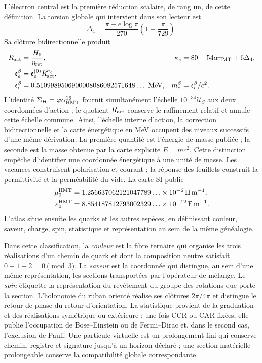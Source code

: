 L'électron central est la première réduction scalaire, de rang un, de cette
définition. La torsion globale qui intervient dans son lecteur est
\[
 \Delta_4=\frac{\pi-e\log\pi}{270}
 \left(1+\frac{\pi}{729}\right).
\]
Sa clôture bidirectionnelle produit
\[
 \begin{aligned}
 R_{\rm act}&=\frac{H_5}{\eta_{\rm ret}},
 &\kappa_e&=80-54\alpha_{\rm HMT}+6\Delta_4,\\
 \mathfrak e_e^\beta&=\mathfrak e_e^{(0)}R_{\rm act}^{\kappa_e},\\
 \mathfrak e_e^\beta
 &=0.5109989506900008086082571648\ldots\ {\rm MeV},
 &m_e^\beta&=\mathfrak e_e^\beta/c^2.
 \end{aligned}
\]
L'identité
\(\Sigma_H=\varphi\alpha_{\rm HMT}^{16}\) fournit simultanément
l'échelle \(10^{-34}\mathcal U_S\) aux deux coordonnées d'action ; le
quotient \(R_{\rm act}\) conserve le raffinement relatif et annule cette
échelle commune. Ainsi, l'échelle interne d'action, la correction bidirectionnelle et la
carte énergétique en MeV occupent des niveaux successifs d'une même dérivation.
La première quantité est l'énergie de masse publiée ; la seconde est la masse
obtenue par la carte explicite $E=mc^2$. Cette distinction empêche d'identifier
une coordonnée énergétique à une unité de masse.
Les vacances construisent polarisation et courant ; la réponse des feuillets
construit la permittivité et la perméabilité du vide. La carte SI publie
\[
 \begin{aligned}
 \mu_0^{\rm HMT}
 &=1.256637062121047789\ldots\times10^{-6}\,\mathrm{H\,m^{-1}},\\
 \varepsilon_0^{\rm HMT}
 &=8.854187812793002329\ldots\times10^{-12}\,\mathrm{F\,m^{-1}}.
 \end{aligned}
\]
L'atlas situe ensuite
les quarks et les autres espèces, en définissant couleur, saveur, charge, spin,
statistique et représentation au sein de la même généalogie.

Dans cette classification, la \emph{couleur} est la fibre ternaire qui organise les
trois réalisations d'un chemin de quark et dont la composition neutre satisfait
\(0+1+2=0\pmod3\). La \emph{saveur} est la coordonnée qui distingue, au sein
d'une même représentation, les sections transportées par l'opérateur de
mélange. Le \emph{spin} étiquette la représentation du revêtement du
groupe des rotations que porte la section. L'holonomie du ruban orienté
réalise ses clôtures \(2\pi/4\pi\) et distingue le retour de phase du retour
d'orientation. La statistique provient de la
graduation et des réalisations symétrique ou extérieure ; une fois CCR ou CAR fixées,
elle publie l'occupation de Bose--Einstein ou de Fermi--Dirac et, dans le second cas,
l'exclusion de Pauli. Une particule virtuelle est un prolongement fini qui
conserve chemin, registre et signature jusqu'à un horizon déclaré ; une section
matérielle prolongeable conserve la compatibilité globale correspondante.

